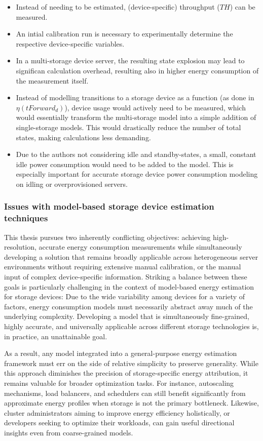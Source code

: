 \begin{itemize}
    \item Instead of needing to be estimated, (device-specific) throughput ($TH$) can be measured.
    \item An intial calibration run is necessary to experimentally determine the respective device-specific variables.
    \item In a multi-storage device server, the resulting state explosion may lead to significan calculation overhead, resulting also in higher energy consumption of the measurement itself.
    \item Instead of modelling transitions to a storage device as a function (as done in $\eta(tForward_d)$), device usage would actively need to be measured, which would essentially transform the multi-storage model into a simple addition of single-storage models. This would drastically reduce the number of total states, making calculations less demanding.
    \item Due to the authors not considering idle and standby-states, a small, constant idle power consumption would need to be added to the model. This is especially important for accurate storage device power consumption modeling on idling or overprovisioned servers.
\end{itemize}

\subsubsection{Issues with model-based storage device estimation techniques}
This thesis pursues two inherently conflicting objectives: achieving high-resolution, accurate energy consumption measurements while simultaneously developing a solution that remains broadly applicable across heterogeneous server environments without requiring extensive manual calibration, or the manual input of complex device-specific information. Striking a balance between these goals is particularly challenging in the context of model-based energy estimation for storage devices: Due to the wide variability among devices for a variety of factors, energy consumption models must necessarily abstract away much of the underlying complexity. Developing a model that is simultaneously fine-grained, highly accurate, and universally applicable across different storage technologies is, in practice, an unattainable goal.

As a result, any model integrated into a general-purpose energy estimation framework must err on the side of relative simplicity to preserve generality. While this approach diminishes the precision of storage-specific energy attribution, it remains valuable for broader optimization tasks. For instance, autoscaling mechanisms, load balancers, and schedulers can still benefit significantly from approximate energy profiles when storage is not the primary bottleneck. Likewise, cluster administrators aiming to improve energy efficiency holistically, or developers seeking to optimize their workloads, can gain useful directional insights even from coarse-grained models.

